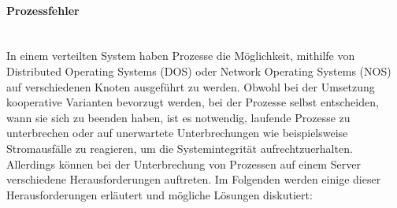 \documentclass[../vs-script-first-v01.tex]{subfiles}
\begin{document}
\paragraph{Prozessfehler}\mbox{}\\
In einem verteilten System haben Prozesse die Möglichkeit, mithilfe von Distributed Operating Systems (DOS) oder Network Operating Systems (NOS) auf verschiedenen Knoten ausgeführt zu werden. Obwohl bei der Umsetzung  kooperative Varianten bevorzugt werden, bei der Prozesse selbst entscheiden, wann sie sich zu beenden haben, ist es notwendig, laufende Prozesse zu unterbrechen oder auf unerwartete Unterbrechungen wie beispielsweise Stromausfälle zu reagieren, um die Systemintegrität aufrechtzuerhalten. Allerdings können bei der Unterbrechung von Prozessen auf einem Server verschiedene Herausforderungen auftreten. Im Folgenden werden einige dieser Herausforderungen erläutert und mögliche Lösungen diskutiert:
\end{document}
